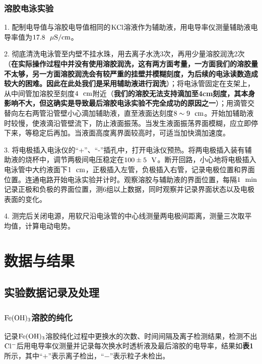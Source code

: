 \documentclass[12pt]{article}
\begin{document}
			\subsubsection{溶胶电泳实验}
				1. 配制电导值与溶胶电导值相同的$\rm KCl$溶液作为辅助液，用电导率仪测量辅助液电导率值为$17.8\ \ {\rm \mu S/cm}$。\par 
				2. 彻底清洗电泳管至内壁不挂水珠，用去离子水洗3次，再用少量溶胶润洗2次（\textbf{在实际操作过程中并没有使用溶胶润洗，这有两方面考量，一方面我们的溶胶量不太够，另一方面溶胶润洗会有较严重的挂壁并模糊刻度，为后续的电泳读数造成较大的困难。因此在此处我们是采用辅助液进行润洗}）；将电泳管固定在支架上，从中间管加溶胶至刻度$\rm 4\ \ cm$附近（\textbf{我们的溶胶无法支持滴加至4cm刻度，其本身影响不大，但这确实是导致最后溶胶电泳实验不完全成功的原因之一}）；用滴管交替向左右两管沿管壁小心滴加辅助液，直至液面达刻度$\rm 8\sim 9\ \ cm$。开始加辅助液时较慢，使液滴沿管壁流下，防止液面振荡。当发生液面振荡界面模糊，应立即停下来，等稳定后再加。当液面高度离界面较高时，可适当加快滴加速度。\par 
				3. 将电极插入电泳仪的“+”、“-”插孔中，打开电泳仪预热。将两电极插入装有辅助液的烧杯中，调节两极间电压稳定在$\rm 100\pm 5\ \ V$。断开回路，小心地将电极插入电泳管中大约液面下$1\ \ \rm cm$，正极插入左管，负极插入右管，记录电极位置和界面位置。连通电路开始电泳实验并计时。观察溶胶与辅助液的界面位置，每隔$\rm 1\ \ min$记录正极和负极的界面位置，测6组以上数据，同时观察并记录界面状态以及电极表面的变化。\par 
				4. 测完后关闭电源，用软尺沿电泳管的中心线测量两电极间距离，测量三次取平均值，计算电动电势。
	
	 \section{数据与结果}
 		\subsection{实验数据记录及处理}
 			\subsubsection{$\rm Fe(OH)_{3}$溶胶的纯化}
			 记录$\rm Fe(OH)_{3}$溶胶纯化过程中更换水的次数、时间间隔及离子检测结果，检测不出$\rm Cl^{-}$后用电导率仪测量并记录每次换水时透析液及最后溶胶的电导率，结果如\textbf{表1}所示，其中“$+$”表示离子检出，“$-$”表示粒子未检出。
		 		
\end{document}
